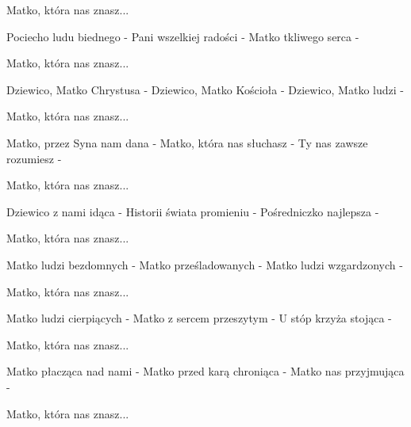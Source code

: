 \documentclass[../../../songbook.tex]{subfiles}
\begin{document}
{\begin{multicols}{2}
\-\hspace{1cm} Matko, która nas znasz...				 \newline
	
Pociecho ludu biednego -				 \newline
Pani wszelkiej radości -				 \newline
Matko tkliwego serca -				 \newline
	
\-\hspace{1cm} Matko, która nas znasz...				 \newline
	
Dziewico, Matko Chrystusa -				 \newline
Dziewico, Matko Kościoła -				 \newline
Dziewico, Matko ludzi -				 \newline
	
\-\hspace{1cm} Matko, która nas znasz...				 \newline
	
Matko, przez Syna nam dana -				 \newline
Matko, która nas słuchasz -				 \newline
Ty nas zawsze rozumiesz -				 \newline
	
\-\hspace{1cm} Matko, która nas znasz...				 \newline
	
Dziewico z nami idąca -				 \newline
Historii świata promieniu -				 \newline
Pośredniczko najlepsza -				 \newline
	
\-\hspace{1cm} Matko, która nas znasz...				 \newline
	
Matko ludzi bezdomnych -				 \newline
Matko prześladowanych -				 \newline
Matko ludzi wzgardzonych -				 \newline
	
\-\hspace{1cm} Matko, która nas znasz...				 \newline
	
Matko ludzi cierpiących -				 \newline
Matko z sercem przeszytym -				 \newline
U stóp krzyża stojąca -				 \newline
	
\-\hspace{1cm} Matko, która nas znasz...				 \newline
	
Matko płacząca nad nami -				 \newline
Matko przed karą chroniąca -				 \newline
Matko nas przyjmująca -				 \newline
	
\-\hspace{1cm} Matko, która nas znasz...				 \newline

\end{multicols}
}
\end{document}

